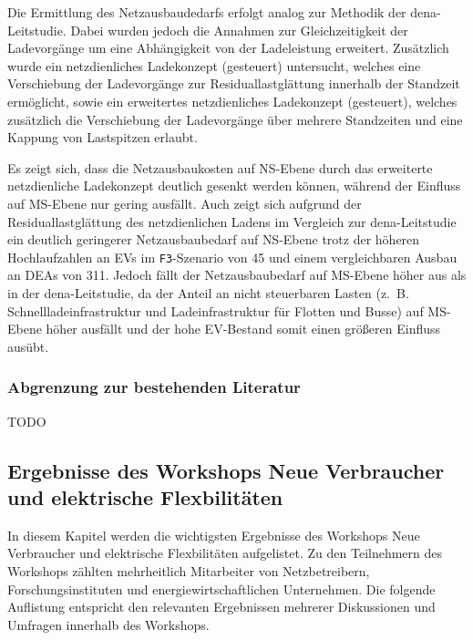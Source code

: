 Die Ermittlung des Netzausbaudedarfs erfolgt analog zur Methodik der dena-Leitstudie.
Dabei wurden jedoch die Annahmen zur Gleichzeitigkeit der Ladevorgänge um eine Abhängigkeit von der Ladeleistung erweitert.
Zusätzlich wurde ein netzdienliches Ladekonzept (gesteuert) untersucht, welches eine Verschiebung der Ladevorgänge zur Residuallastglättung innerhalb der Standzeit ermöglicht, sowie ein erweitertes netzdienliches Ladekonzept (gesteuert\Plus), welches zusätzlich die Verschiebung der Ladevorgänge über mehrere Standzeiten und eine Kappung von Lastspitzen erlaubt.\medskip

Es zeigt sich, dass die Netzausbaukosten auf \gls{NS}-Ebene durch das erweiterte netzdienliche Ladekonzept deutlich gesenkt werden können, während der Einfluss auf \gls{MS}-Ebene nur gering ausfällt.
Auch zeigt sich aufgrund der Residuallastglättung des netzdienlichen Ladens im Vergleich zur dena-Leitstudie ein deutlich geringerer Netzausbaubedarf auf \gls{NS}-Ebene trotz der höheren Hochlaufzahlen an \glspl{EV} im \texttt{F3}-Szenario von \SI{45}{\MioStk} und einem vergleichbaren Ausbau an \glspl{DEA} von \SI{311}{\gw}.
Jedoch fällt der Netzausbaubedarf auf \gls{MS}-Ebene höher aus als in der dena-Leitstudie, da der Anteil an nicht steuerbaren Lasten (z.~B. Schnellladeinfrastruktur und Ladeinfrastruktur für Flotten und Busse) auf \gls{MS}-Ebene höher ausfällt und der hohe \gls{EV}-Bestand somit einen größeren Einfluss ausübt.


\subsubsection{Abgrenzung zur bestehenden Literatur}

{\color{red} TODO}


\subsection{Ergebnisse des Workshops \glqq Neue Verbraucher und elektrische Flexbilitäten\grqq{}}

In diesem Kapitel werden die wichtigsten Ergebnisse des Workshops \glqq Neue Verbraucher und elektrische Flexbilitäten\grqq{} aufgelistet.
Zu den Teilnehmern des Workshops zählten mehrheitlich Mitarbeiter von Netzbetreibern, Forschungsinstituten und energiewirtschaftlichen Unternehmen.
Die folgende Auflistung entspricht den relevanten Ergebnissen mehrerer Diskussionen und Umfragen innerhalb des Workshops.

